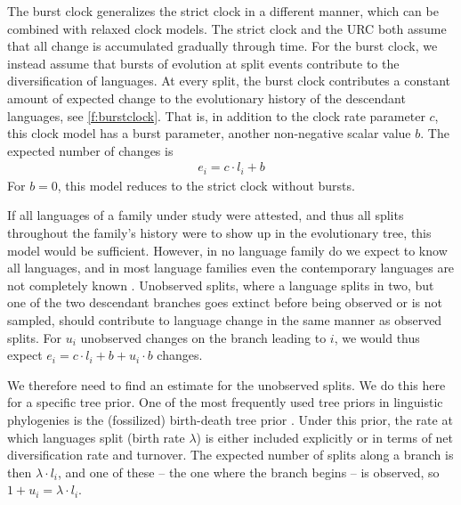 \documentclass[]{rsos}%
\begin{document}
The burst clock generalizes the strict clock in a different manner, which can be combined with relaxed clock models.
The strict clock and the URC both assume that all change is accumulated gradually
through time.
For the burst clock, we instead assume that bursts of evolution at split events
contribute to the diversification of languages.
At every split, the burst clock contributes a
constant amount of expected change to the evolutionary history of the
descendant languages, see \cref{f:burstclock}. That is, in addition to the clock rate parameter $c$, this clock model
has a burst parameter, another non-negative scalar value $b$.
The expected number of changes is
\begin{align}
  e_i = c \cdot l_i + b
  \label{eq:simple-burst}
\end{align}
For $b=0$, this model reduces to the strict clock without bursts.

%

If all languages of a family under study were attested, and thus all splits throughout
the family's history were to show up in the evolutionary tree, this model would be sufficient.
However, in no language family do we expect to know all languages, and in most
language families even the contemporary languages are not completely known \parencite{}. 
Unobserved splits, where a language splits in two, but one of
the two descendant branches goes extinct before being observed or is not sampled,
should contribute to language change in the same manner as observed splits.
For $u_i$ unobserved changes on the branch leading to $i$, we would thus expect $e_i = c \cdot l_i + b + u_i \cdot b$ changes.

We therefore need to find an estimate for the unobserved splits.
We do this here for a specific tree prior.
One of the most frequently used tree priors in linguistic phylogenies
is the (fossilized) birth-death tree prior \parencite{gernhard2008conditioned,stadler2010samplingthroughtime,heath2014fossilized}.
Under this prior, the rate at which
languages split (birth rate $\lambda$) is either included explicitly or in terms of net diversification rate and turnover.
The expected number of splits along a branch is then $\lambda \cdot l_i$, and one of these – the one where the branch begins – is observed, so $1 + u_i = \lambda \cdot l_i$.
\end{document}

